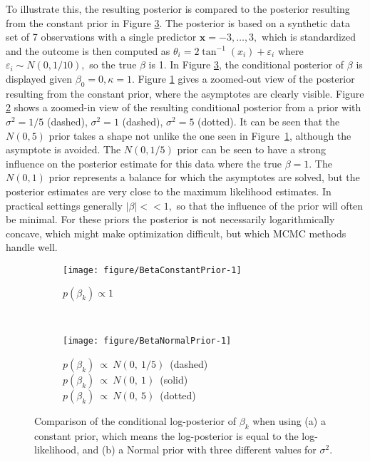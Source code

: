\documentclass[11pt,a4paper]{article}\usepackage[]{graphicx}\usepackage[]{color}
\makeatletter
\def\maxwidth{ %
  \ifdim\Gin@nat@width>\linewidth
    \linewidth
  \else
    \Gin@nat@width
  \fi
}
\newenvironment{knitrout}{}{} %
\newcommand{\bx}{\boldsymbol{x}}
\makeatother
\begin{document}
To illustrate this, the resulting posterior is compared to the posterior resulting from the constant prior in Figure \ref{LikelihoodPriorComparisonBeta}. The posterior is based on a synthetic data set of 7 observations with a single predictor \(\bx = -3, \dots, 3,\) which is standardized and the outcome is then computed as \( \theta_i =  2 \tan^{-1}(x_i) + \varepsilon_i \) where \( \varepsilon_i \sim N(0, 1/10),\) so the true \(\beta\) is 1. In Figure \ref{LikelihoodPriorComparisonBeta}, the conditional posterior of \(\beta\) is displayed given \(\beta_0 = 0, \kappa = 1.\) Figure \ref{BetaConstantPrior} gives a zoomed-out view of the  posterior resulting from the constant prior, where the asymptotes are clearly visible. Figure \ref{BetaNormalPrior} shows a zoomed-in view of the resulting conditional posterior from a prior with \(\sigma^2 = 1/5\) (dashed), \(\sigma^2 = 1\) (dashed), \(\sigma^2 = 5\) (dotted). It can be seen that the \(N(0, 5)\) prior takes a shape not unlike the one seen in Figure~\ref{BetaConstantPrior}, although the asymptote is avoided. The \(N(0, 1/5)\) prior can be seen to have a strong influence on the posterior estimate for this data where the true \(\beta = 1.\) The \(N(0, 1)\) prior represents a balance for which the asymptotes are solved, but the posterior estimates are very close to the maximum likelihood estimates. In practical settings generally \(\vert\beta\vert << 1,\) so that the influence of the prior will often be minimal. For these priors the posterior is not necessarily logarithmically concave, which might make optimization difficult, but which MCMC methods handle well.



\begin{figure}
\begin{subfigure}[t]{0.5\textwidth}
\begin{knitrout}
\color{fgcolor}
\texttt{[image: figure/BetaConstantPrior-1]} 

\end{knitrout}
\caption{$p(\beta_k) \propto 1$}
\label{BetaConstantPrior}
\end{subfigure}
~
\begin{subfigure}[t]{0.5\textwidth}
\begin{knitrout}
\color{fgcolor}
\texttt{[image: figure/BetaNormalPrior-1]} 

\end{knitrout}
\caption[;  ; ]
    {$p(\beta_k)~\propto~N(0,~1/5)$~(dashed) \\ $p(\beta_k)~\propto~N(0,~1)$~(solid) \\ $p(\beta_k)~\propto~N(0,~5)$~(dotted) \endtabular}
\label{BetaNormalPrior}
\end{subfigure}

\caption{Comparison of the conditional log-posterior of $\beta_k$ when using (a) a constant prior, which means the log-posterior is equal to the log-likelihood, and (b) a Normal prior with three different values for \(\sigma^2\).}
\label{LikelihoodPriorComparisonBeta}
\end{figure}
\end{document}
